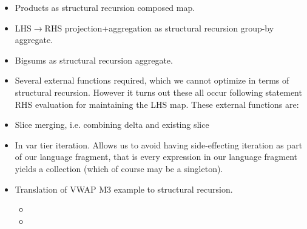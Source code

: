 \begin{itemize}
  \item Products as structural recursion composed map.
  \item LHS$\rightarrow$RHS projection+aggregation as structural recursion
  group-by aggregate.
  \item Bigsums as structural recursion aggregate.
\end{itemize}

\begin{itemize}
  \item Several external functions required, which we cannot optimize in terms
  of structural recursion. However it turns out these all occur following
  statement RHS evaluation for maintaining the LHS map. These external
  functions are:
  \item Slice merging, i.e. combining delta and existing slice
  \item In var tier iteration. Allows us to avoid having side-effecting
  iteration as part of our language fragment, that is every expression in our
  language fragment yields a collection (which of course may be a singleton).
\end{itemize}

\begin{itemize}
  \item Translation of VWAP M3 example to structural recursion.
  \begin{itemize}
    \item {}
    \item {}
  \end{itemize}
\end{itemize}

\def \srin#1{\llbracket #1 \rrbracket_{\mbox{\tiny{In}}}}
\def \srsub#1#2{(#1)[#2]}

